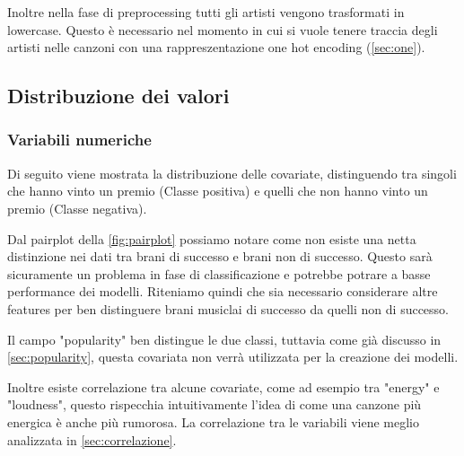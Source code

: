 Inoltre nella fase di preprocessing tutti gli artisti vengono trasformati in lowercase. Questo è necessario nel momento in cui si vuole tenere traccia degli artisti nelle canzoni con una rappreszentazione one hot encoding (\autoref{sec:one}).

\subsection{Distribuzione dei valori}
\subsubsection{Variabili numeriche}
Di seguito viene mostrata la distribuzione delle covariate, distinguendo tra singoli che hanno vinto un premio (Classe positiva) e quelli che non hanno vinto un premio (Classe negativa).

Dal pairplot della \autoref{fig:pairplot} possiamo notare come non esiste una netta distinzione nei dati tra brani di successo e brani non di successo. Questo sarà sicuramente un problema in fase di classificazione e potrebbe potrare a basse performance dei modelli. Riteniamo quindi che sia necessario considerare altre features per ben distinguere brani musiclai di successo da quelli non di successo.

Il campo "popularity" ben distingue le due classi, tuttavia come già discusso in \autoref{sec:popularity}, questa covariata non verrà utilizzata per la creazione dei modelli.

Inoltre esiste correlazione tra alcune covariate, come ad esempio tra "energy" e "loudness", questo rispecchia intuitivamente l'idea di come una canzone più energica è anche più rumorosa. La correlazione tra le variabili viene meglio analizzata in \autoref{sec:correlazione}.


